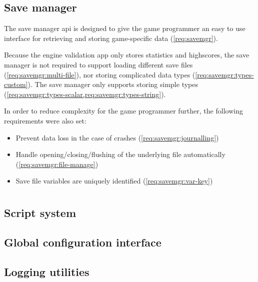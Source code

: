 \documentclass{projdoc}
\begin{document}
\subsection{Save manager}

The save manager \gls{api} is designed to give the game programmer an easy to use
interface for retrieving and storing game-specific data (\cref{req:savemgr}).

Because the engine validation app only stores statistics and highscores, the save
manager is not required to support loading different save files
(\cref{req:savemgr:multi-file}), nor storing complicated data types
(\cref{req:savemgr:types-custom}). The save manager only supports storing simple
types (\cref{req:savemgr:types-scalar,req:savemgr:types-string}).

In order to reduce complexity for the game programmer further, the following
requirements were also set:\noparbreak

\begin{itemize}
	\item Prevent data loss in the case of crashes (\cref{req:savemgr:journalling})
	\item Handle opening/closing/flushing of the underlying file automatically
		(\cref{req:savemgr:file-manage})
	\item Save file variables are uniquely identified (\cref{req:savemgr:var-key})
\end{itemize}

% 
% 



\appendix

\section{}

\subsection{Script system}
\label{poc:scripts}

\subsection{Global configuration interface}

\subsection{Logging utilities}
\end{document}
